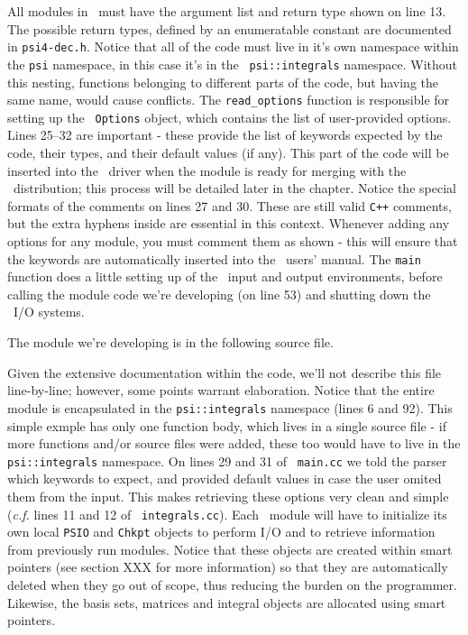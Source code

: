 All modules in \PSIfour\ must have the argument list and return type shown on
line 13.  The possible return types, defined by an enumeratable constant are
documented in {\tt psi4-dec.h}.  Notice that all of the code must live in it's
own namespace within the {\tt psi} namespace, in this case it's in the {\tt
psi::integrals} namespace.  Without this nesting, functions belonging to
different parts of the code, but having the same name, would cause conflicts.
The {\tt read\_options} function is responsible for setting up the {\tt
Options} object, which contains the list of user-provided options.  Lines
25--32 are important - these provide the list of keywords expected by the code,
their types, and their default values (if any).  This part of the code will be
inserted into the \PSIfour\ driver when the module is ready for merging with
the \PSIfour\ distribution; this process will be detailed later in the chapter.
Notice the special formats of the comments on lines 27 and 30.  These are still
valid {\tt C++} comments, but the extra hyphens inside are essential in this
context.  Whenever adding any options for any module, you must comment them as
shown - this will ensure that the keywords are automatically inserted into the
\PSIfour\ users' manual.  The {\tt main} function does a little setting up of
the \PSI\ input and output environments, before calling the module code we're
developing (on line 53) and shutting down the \PSIfour\ I/O systems.

The module we're developing is in the following source file.

Given the extensive documentation within the code, we'll not describe this file
line-by-line; however, some points warrant elaboration.  Notice that the entire
module is encapsulated in the {\tt psi::integrals} namespace (lines 6 and 92).
This simple exmple has only one function body, which lives in a single source
file - if more functions and/or source files were added, these too would have
to live in the {\tt psi::integrals} namespace.  On lines 29 and 31 of {\tt
main.cc} we told the parser which keywords to expect, and provided default
values in case the user omited them from the input.  This makes retrieving
these options very clean and simple ({\it c.f.} lines 11 and 12 of {\tt
integrals.cc}).  Each \PSIfour\ module will have to initialize its own local
{\tt PSIO} and {\tt Chkpt} objects to perform I/O and to retrieve information
from previously run modules.  Notice that these objects are created within
smart pointers (see section XXX for more information) so that they are
automatically deleted when they go out of scope, thus reducing the burden on
the programmer.  Likewise, the basis sets, matrices and integral objects are
allocated using smart pointers.


